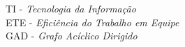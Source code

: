 TI      - \textit{Tecnologia da Informação}\\
ETE     - \textit{Eficiência do Trabalho em Equipe}\\
GAD		- \textit{Grafo Acíclico Dirigido}

